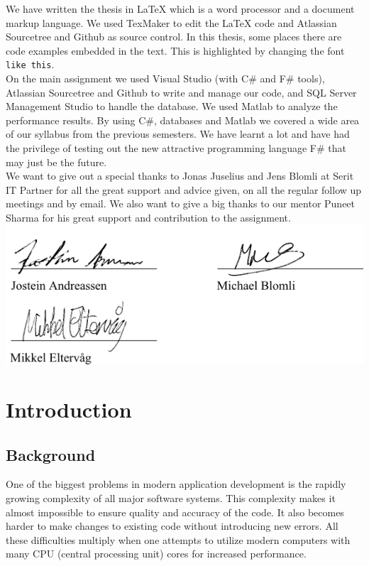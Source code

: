 \documentclass[12pt, a4paper]{article}
\newcommand{\code}[1]{{\small \texttt{#1}}}
\begin{document}
We have written the thesis in LaTeX which is a word processor and a document markup language. We used TexMaker to edit the LaTeX code and Atlassian Sourcetree and Github as source control. 
In this thesis, some places there are code examples embedded in the text. This is highlighted by changing the font \code{like this}.\\

On the main assignment we used Visual Studio (with C\# and F\# tools), Atlassian Sourcetree and Github to write and manage our code, and SQL Server Management Studio to handle the database. We used Matlab to analyze the performance results. By using C\#, databases and Matlab we covered a wide area of our syllabus from the previous semesters. We have learnt a lot and have had the privilege of testing out the new attractive programming language F\# that may just be the future. \\

We want to give out a special thanks to Jonas Juselius and Jens Blomli at Serit IT Partner for all the great support and advice given, on all the regular follow up meetings and by email. We also want to give a big thanks to our mentor Puneet Sharma for his great support and contribution to the assignment.\\


\includegraphics[scale=0.7]{sign}


\newpage
\tableofcontents

\newpage
\section{Introduction}
\subsection{Background}
One of the biggest problems in modern application development is the rapidly growing complexity of all major software systems. This complexity makes it almost impossible to ensure quality and accuracy of the code. It also becomes harder to make changes to existing code without introducing new errors. All these difficulties multiply when one attempts to utilize modern computers with many CPU (central processing unit) cores for increased performance.\\
\end{document}
